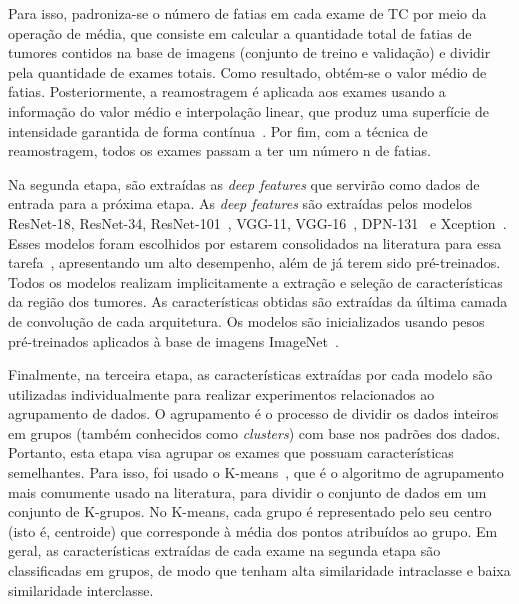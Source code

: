 Para isso, padroniza-se o número de fatias em cada exame de TC por meio da operação de média, que consiste em calcular a quantidade total de fatias de tumores contidos na base de imagens (conjunto de treino e validação) e dividir pela quantidade de exames totais. Como resultado, obtém-se o valor médio de fatias. Posteriormente, a reamostragem é aplicada aos exames usando a informação do valor médio e interpolação linear, que produz uma superfície de intensidade garantida de forma contínua~\cite{andrews1976digital, dodgson1992image}. Por fim, com a técnica de reamostragem, todos os exames passam a ter um número n de fatias.

Na segunda etapa, são extraídas as \textit{deep features} que servirão como dados de entrada para a próxima etapa. As \textit{deep features} são extraídas pelos modelos ResNet-18, ResNet-34, ResNet-101~\cite{He7780459}, VGG-11, VGG-16~\cite{simonyan2014very}, DPN-131~\cite{chen2017dual} e Xception~\cite{chollet2017xception}. Esses modelos foram escolhidos por estarem consolidados na literatura para essa tarefa~\cite{8875911}, apresentando um alto desempenho, além de já terem sido pré-treinados. Todos os modelos realizam implicitamente a extração e seleção de características da região dos tumores. As características obtidas são extraídas da última camada de convolução de cada arquitetura. Os modelos são inicializados usando pesos pré-treinados aplicados à base de imagens ImageNet~\cite{deng2009imagenet}.

Finalmente, na terceira etapa, as características extraídas por cada modelo são utilizadas individualmente para realizar experimentos relacionados ao agrupamento de dados. O agrupamento é o processo de dividir os dados inteiros em grupos (também conhecidos como \textit{clusters}) com base nos padrões dos dados. Portanto, esta etapa visa agrupar os exames que possuam características semelhantes. Para isso, foi usado o K-means~\cite{macqueen1967some,hamerly2003learning}, que é o algoritmo de agrupamento mais comumente usado na literatura, para dividir o conjunto de dados em um conjunto de K-grupos. No K-means, cada grupo é representado pelo seu centro (isto é, centroide) que corresponde à média dos pontos atribuídos ao grupo. Em geral, as características extraídas de cada exame na segunda etapa são classificadas em grupos, de modo que tenham alta similaridade intraclasse e baixa similaridade interclasse.

